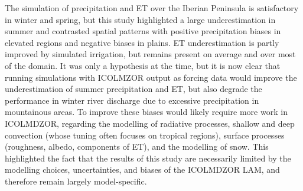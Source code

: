 The simulation of precipitation and ET over the Iberian Peninsula is satisfactory in winter and spring, but this study highlighted a large underestimation in summer and contrasted spatial patterns with positive precipitation biases in elevated regions and negative biases in plains. ET underestimation is partly improved by simulated irrigation, but remains present on average and over most of the domain. 
It was only a hypothesis at the time, but it is now clear that running simulations with ICOLMZOR output as forcing data would improve the underestimation of summer precipitation and ET, but also degrade the performance in winter river discharge due to excessive precipitation in mountainous areas.
To improve these biases would likely require more work in ICOLMDZOR, regarding the modelling of radiative processes, shallow and deep convection (whose tuning often focuses on tropical regions), surface processes (roughness, albedo, components of ET), and the modelling of snow. This highlighted the fact that the results of this study are necessarily limited by the modelling choices, uncertainties, and biases of the ICOLMDZOR LAM, and therefore remain largely model-specific.

